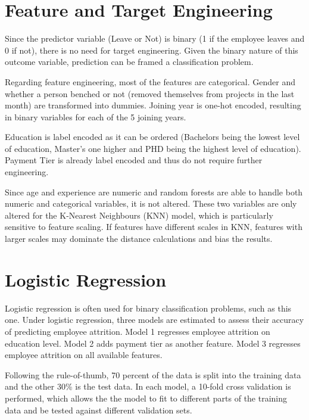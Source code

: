 \documentclass[11pt,preprint, authoryear]{elsarticle}
\numberwithin{equation}{section}
\numberwithin{figure}{section}
\numberwithin{table}{section}
\begin{document}
\hypertarget{feature-and-target-engineering}{%
\section*{Feature and Target
Engineering}\label{feature-and-target-engineering}}

Since the predictor variable (Leave or Not) is binary (1 if the employee
leaves and 0 if not), there is no need for target engineering. Given the
binary nature of this outcome variable, prediction can be framed a
classification problem.

Regarding feature engineering, most of the features are categorical.
Gender and whether a person benched or not (removed themselves from
projects in the last month) are transformed into dummies. Joining year
is one-hot encoded, resulting in binary variables for each of the 5
joining years.

Education is label encoded as it can be ordered (Bachelors being the
lowest level of education, Master's one higher and PHD being the highest
level of education). Payment Tier is already label encoded and thus do
not require further engineering.

Since age and experience are numeric and random forests are able to
handle both numeric and categorical variables, it is not altered. These
two variables are only altered for the K-Nearest Neighbours (KNN) model,
which is particularly sensitive to feature scaling. If features have
different scales in KNN, features with larger scales may dominate the
distance calculations and bias the results.

\hypertarget{logistic-regression}{%
\section*{Logistic Regression}\label{logistic-regression}}

Logistic regression is often used for binary classification problems,
such as this one. Under logistic regression, three models are estimated
to assess their accuracy of predicting employee attrition. Model 1
regresses employee attrition on education level. Model 2 adds payment
tier as another feature. Model 3 regresses employee attrition on all
available features.

Following the rule-of-thumb, 70 percent of the data is split into the
training data and the other 30\% is the test data. In each model, a
10-fold cross validation is performed, which allows the the model to fit
to different parts of the training data and be tested against different
validation sets.
\end{document}
